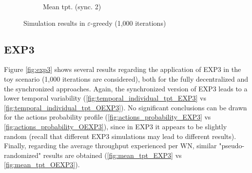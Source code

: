 \documentclass[preprint,12pt]{article}
\begin{document}
\begin{figure}[h!]
\begin{subfigure}[b]{.3\textwidth}
		\caption{Mean tpt. (sync. 2)}\label{fig:mean_tpt_CEG}
	\end{subfigure}
	\caption{Simulation results in $\varepsilon$-greedy (1,000 iterations)}
	\label{fig:e_greedy}
\end{figure}

\subsection{EXP3}
\label{section:exp3}

Figure \ref{fig:exp3} shows several results regarding the application of EXP3 in the toy scenario (1,000 iterations are considered), both for the fully decentralized and the synchronized approaches. Again, the synchronized version of EXP3 leads to a lower temporal variability (\ref{fig:temporal_individual_tpt_EXP3} vs \ref{fig:temporal_individual_tpt_OEXP3}). No significant conclusions can be drawn for the actions probability profile (\ref{fig:actions_probability_EXP3} vs \ref{fig:actions_probability_OEXP3}), since in EXP3 it appears to be slightly random (recall that different EXP3 simulations may lead to different results). Finally, regarding the average throughput experienced per WN, similar "pseudo-randomized" results are obtained (\ref{fig:mean_tpt_EXP3} vs \ref{fig:mean_tpt_OEXP3}). 
\end{document}
